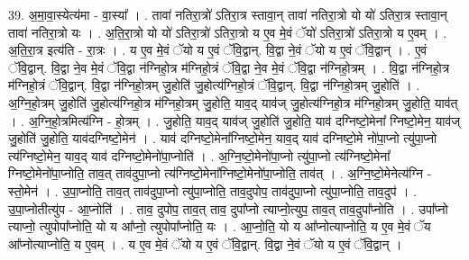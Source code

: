 \documentclass[17pt]{extarticle}
\begin{document}
39. अ॒मा॒वा॒स्येत्य॑मा - वा॒स्या᳚ । . तावा॑ नतिरा॒त्रो॑ ऽतिरा॒त्र स्तावा॒न् तावा॑ नतिरा॒त्रो यो यो॑ ऽतिरा॒त्र स्तावा॒न् तावा॑ नतिरा॒त्रो यः । . अ॒ति॒रा॒त्रो यो यो॑ ऽतिरा॒त्रो॑ ऽतिरा॒त्रो य ए॒व मे॒वं ॅयो॑ ऽतिरा॒त्रो॑ ऽतिरा॒त्रो य ए॒वम् । . अ॒ति॒रा॒त्र इत्य॑ति - रा॒त्रः । . य ए॒व मे॒वं ॅयो य ए॒वं ॅवि॒द्वान्. वि॒द्वा ने॒वं ॅयो य ए॒वं ॅवि॒द्वान् । . ए॒वं ॅवि॒द्वान्. वि॒द्वा ने॒व मे॒वं ॅवि॒द्वा न॑ग्निहो॒त्र म॑ग्निहो॒त्रं ॅवि॒द्वा ने॒व मे॒वं ॅवि॒द्वा न॑ग्निहो॒त्रम् । . वि॒द्वा न॑ग्निहो॒त्र म॑ग्निहो॒त्रं ॅवि॒द्वान्. वि॒द्वा न॑ग्निहो॒त्रम् जु॒होति॑ जु॒होत्य॑ग्निहो॒त्रं ॅवि॒द्वान्. वि॒द्वा न॑ग्निहो॒त्रम् जु॒होति॑ । . अ॒ग्नि॒हो॒त्रम् जु॒होति॑ जु॒होत्य॑ग्निहो॒त्र म॑ग्निहो॒त्रम् जु॒होति॒ याव॒द् याव॑ज् जु॒होत्य॑ग्निहो॒त्र म॑ग्निहो॒त्रम् जु॒होति॒ याव॑त् । . अ॒ग्नि॒हो॒त्रमित्य॑ग्नि - हो॒त्रम् । . जु॒होति॒ याव॒द् याव॑ज् जु॒होति॑ जु॒होति॒ याव॑ दग्निष्टो॒मेना᳚ ग्निष्टो॒मेन॒ याव॑ज् जु॒होति॑ जु॒होति॒ याव॑दग्निष्टो॒मेन॑ । . याव॑ दग्निष्टो॒मेना᳚ग्निष्टो॒मेन॒ याव॒द् याव॑ दग्निष्टो॒मे नो॑पा॒प्नो त्यु॑पा॒प्नो त्य॑ग्निष्टो॒मेन॒ याव॒द् याव॑ दग्निष्टो॒मेनो॑पा॒प्नोति॑ । . अ॒ग्नि॒ष्टो॒मेनो॑पा॒प्नो त्यु॑पा॒प्नो त्य॑ग्निष्टो॒मेना᳚ ग्निष्टो॒मेनो॑पा॒प्नोति॒ ताव॒त् ताव॑दुपा॒प्नो त्य॑ग्निष्टो॒मेना᳚ग्निष्टो॒मेनो॑पा॒प्नोति॒ ताव॑त् । . अ॒ग्नि॒ष्टो॒मेनेत्य॑ग्नि - स्तो॒मेन॑ । . उ॒पा॒प्नोति॒ ताव॒त् ताव॑दुपा॒प्नो त्यु॑पा॒प्नोति॒ ताव॒दुपोप॒ ताव॑दुपा॒प्नो त्यु॑पा॒प्नोति॒ ताव॒दुप॑ । . उ॒पा॒प्नोतीत्यु॑प - आ॒प्नोति॑ । . ताव॒ दुपोप॒ ताव॒त् ताव॒ दुपा᳚प्नो त्याप्नो॒त्युप॒ ताव॒त् ताव॒दुपा᳚प्नोति । . उपा᳚प्नो त्याप्नो॒ त्युपोपा᳚प्नोति॒ यो य आ᳚प्नो॒ त्युपोपा᳚प्नोति॒ यः । . आ॒प्नो॒ति॒ यो य आ᳚प्नोत्याप्नोति॒ य ए॒व मे॒वं ॅय आ᳚प्नोत्याप्नोति॒ य ए॒वम् । . य ए॒व मे॒वं ॅयो य ए॒वं ॅवि॒द्वान्. वि॒द्वा ने॒वं ॅयो य ए॒वं ॅवि॒द्वान् । \newline
\end{document}
